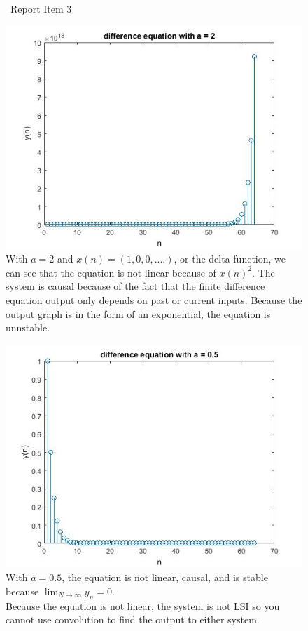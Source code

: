 \documentclass{article}
\begin{document}
\begin{figure}[H]
\ Report Item 3

\includegraphics[scale = .5]{report3}
\\ With $a = 2$ and $x(n) = (1,0,0,....)$, or the delta function, we can see that the equation is not linear because of $x(n)^{2}$. The system is causal because of the fact that the finite difference equation output only depends on past or current inputs. Because the output graph is in the form of an exponential, the equation is unnstable.
\end{figure}
\begin{figure}[H]
\includegraphics[scale = .5]{report3_2}
\\ With $a = 0.5$, the equation is not linear, causal, and is stable because $\lim_{N\to\infty} y_n = 0$.
\\ Because the equation is not linear, the system is not LSI so you cannot use convolution to find the output to either system.
\end{figure}
\end{document}
